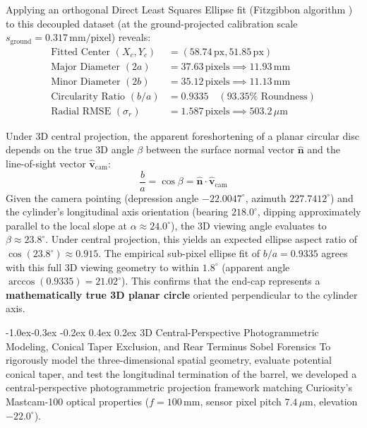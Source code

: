 \documentclass[11pt,a4paper]{article}
\makeatletter
\renewcommand\subsection{\@startsection{subsection}{2}{\z@}%
                                     {-1.0ex\@plus -0.3ex \@minus -0.2ex}%
                                     {0.4ex \@plus 0.2ex}%
                                     {\normalfont\normalsize\bfseries}}
\makeatother
\begin{document}
Applying an orthogonal Direct Least Squares Ellipse fit (Fitzgibbon algorithm \cite{fitzgibbon1999}) to this decoupled dataset (at the ground-projected calibration scale $s_{\text{ground}} = 0.317\,\text{mm/pixel}$) reveals:
\begin{align}
	\text{Fitted Center } (X_c, Y_c) & = (58.74\,\text{px}, 51.85\,\text{px})             \\
	\text{Major Diameter } (2a)      & = 37.63\,\text{pixels} \implies 11.93\,\text{mm}   \\
	\text{Minor Diameter } (2b)      & = 35.12\,\text{pixels} \implies 11.13\,\text{mm}   \\
	\text{Circularity Ratio } (b/a)  & = 0.9335 \quad (93.35\%\text{ Roundness})          \\
	\text{Radial RMSE } (\sigma_r)   & = 1.587\,\text{pixels} \implies 503.2\,\mu\text{m}
\end{align}

Under 3D central projection, the apparent foreshortening of a planar circular disc depends on the true 3D angle $\beta$ between the surface normal vector $\mathbf{\hat{n}}$ and the line-of-sight vector $\mathbf{\hat{v}}_{\text{cam}}$:
\begin{equation}
	\frac{b}{a} = \cos\beta = \mathbf{\hat{n}} \cdot \mathbf{\hat{v}}_{\text{cam}}
\end{equation}
Given the camera pointing (depression angle $-22.0047^\circ$, azimuth $227.7412^\circ$) and the cylinder's longitudinal axis orientation (bearing $218.0^\circ$, dipping approximately parallel to the local slope at $\alpha \approx 24.0^\circ$), the 3D viewing angle evaluates to $\beta \approx 23.8^\circ$. Under central projection, this yields an expected ellipse aspect ratio of $\cos(23.8^\circ) \approx 0.915$. The empirical sub-pixel ellipse fit of $b/a = 0.9335$ agrees with this full 3D viewing geometry to within $1.8^\circ$ (apparent angle $\arccos(0.9335) = 21.02^\circ$). This confirms that the end-cap represents a \textbf{mathematically true 3D planar circle} oriented perpendicular to the cylinder axis.

\subsection{3D Central-Perspective Photogrammetric Modeling, Conical Taper Exclusion, and Rear Terminus Sobel Forensics}
To rigorously model the three-dimensional spatial geometry, evaluate potential conical taper, and test the longitudinal termination of the barrel, we developed a central-perspective photogrammetric projection framework matching Curiosity's Mastcam-100 optical properties ($f = 100\,\text{mm}$, sensor pixel pitch $7.4\,\mu\text{m}$, elevation $-22.0^\circ$).
\end{document}
